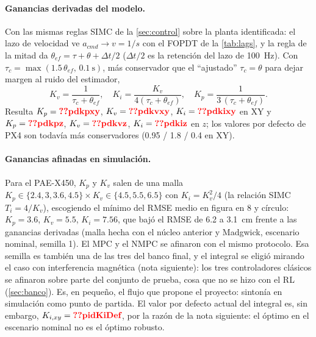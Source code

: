 \paragraph{Ganancias derivadas del modelo.} Con las mismas reglas SIMC de
la \cref{sec:control} sobre la planta identificada: el lazo de velocidad ve
$a_{cmd}\to v=1/s$ con el FOPDT de la \cref{tab:lags}, y la regla de la mitad
da $\theta_{ef}=\tau+\theta+\Delta t/2$ ($\Delta t/2$ es la retención del lazo
de 100~Hz). Con $\tau_c=\max(1.5\,\theta_{ef},\,0.1~\text{s})$, más
conservador que el ``ajustado'' $\tau_c=\theta$ para dejar margen al ruido del
estimador,
\begin{equation}
K_v=\frac{1}{\tau_c+\theta_{ef}},\quad K_i=\frac{K_v}{4(\tau_c+\theta_{ef})},\quad
K_p=\frac{1}{3\,(\tau_c+\theta_{ef})}.
\end{equation}
Resulta $K_p=\val{pdkpxy}$, $K_v=\val{pdkvxy}$, $K_i=\val{pdkixy}$ en XY y
$K_p=\val{pdkpz}$, $K_v=\val{pdkvz}$, $K_i=\val{pdkiz}$ en $z$; los valores por
defecto de PX4 son todavía más conservadores (0.95 / 1.8 / 0.4 en XY).

\paragraph{Ganancias afinadas en simulación.} Para el PAE-X450, $K_p$ y $K_v$
salen de una malla $K_p\in\{2.4,3,3.6,4.5\}\times K_v\in\{4.5,5.5,6.5\}$ con
$K_i=K_v^2/4$ (la relación SIMC $T_i=4/K_v$), escogiendo el mínimo del RMSE
medio en figura en 8 y círculo: $K_p=3.6$, $K_v=5.5$, $K_i=7.56$, que bajó el
RMSE de 6.2 a 3.1~cm frente a las ganancias derivadas (malla hecha con el
núcleo anterior y Madgwick, escenario nominal, semilla 1). El MPC y el NMPC
se afinaron con el mismo protocolo. Esa semilla es también una de las tres
del banco final, y el integral se eligió mirando el caso con interferencia
magnética (nota siguiente): los tres controladores clásicos se afinaron
sobre parte del conjunto de prueba, cosa que no se hizo con el RL
(\cref{sec:banco}). Es, en pequeño, el flujo que propone el proyecto: sintonía en
simulación como punto de partida. El valor por defecto actual del integral
es, sin embargo, $K_{i,xy}=\val{pidKiDef}$, por la razón de la nota
siguiente: el óptimo en el escenario nominal no es el óptimo robusto.

